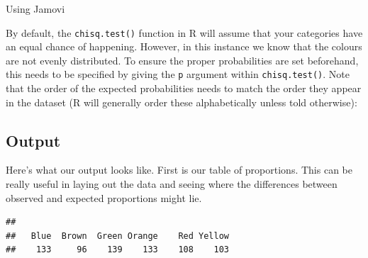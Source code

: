 \documentclass[
]{book}
\newenvironment{Shaded}{\begin{snugshade}}{\end{snugshade}}
\newcommand{\AttributeTok}[1]{\textcolor[rgb]{0.13,0.29,0.53}{#1}}
\newcommand{\CommentTok}[1]{\textcolor[rgb]{0.56,0.35,0.01}{\textit{#1}}}
\newcommand{\FloatTok}[1]{\textcolor[rgb]{0.00,0.00,0.81}{#1}}
\newcommand{\FunctionTok}[1]{\textcolor[rgb]{0.13,0.29,0.53}{\textbf{#1}}}
\newcommand{\NormalTok}[1]{#1}
\newcommand{\OtherTok}[1]{\textcolor[rgb]{0.56,0.35,0.01}{#1}}
\newcommand{\SpecialCharTok}[1]{\textcolor[rgb]{0.81,0.36,0.00}{\textbf{#1}}}
\begin{document}
Using Jamovi

By default, the \texttt{chisq.test()} function in R will assume that your categories have an equal chance of happening. However, in this instance we know that the colours are not evenly distributed. To ensure the proper probabilities are set beforehand, this needs to be specified by giving the \texttt{p} argument within \texttt{chisq.test()}. Note that the order of the expected probabilities needs to match the order they appear in the dataset (R will generally order these alphabetically unless told otherwise):

\begin{Shaded}
\end{Shaded}

\hypertarget{output}{%
\subsection{Output}\label{output}}

Here's what our output looks like. First is our table of proportions. This can be really useful in laying out the data and seeing where the differences between observed and expected proportions might lie.

\begin{Shaded}
\end{Shaded}

\begin{verbatim}
## 
##   Blue  Brown  Green Orange    Red Yellow 
##    133     96    139    133    108    103
\end{verbatim}

\begin{Shaded}
\end{Shaded}
\end{document}
